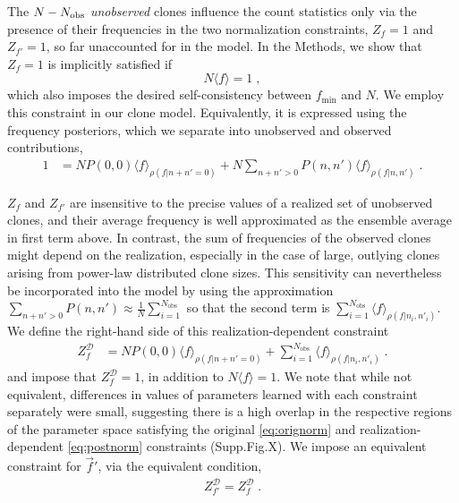\documentclass[letterpaper,english,prl,reprint,longbibliography]{revtex4-1}
\begin{document}
The $N-N_{\textrm{\textrm{obs}}}$ \emph{unobserved} clones influence the count statistics only via the presence of their frequencies in the two normalization constraints, $Z_f=1$ and $Z_{f'}=1$, so far unaccounted for in the model.
In the Methods, we show that $Z_f=1$ is implicitly satisfied if 
\begin{equation}
	N\langle f\rangle=1\;,\label{eq:orignorm}
\end{equation}
which also imposes the desired self-consistency between $f_\textrm{min}$ and $N$. We employ this constraint in our clone model. Equivalently, it is expressed using the frequency posteriors, which we separate into unobserved and observed contributions,
\begin{align*}
	1&= NP(0,0) \langle f\rangle_{\rho(f|n+n'=0)}+	N\sum_{n+n'>0}P(n,n')\langle f\rangle_{\rho(f|n,n')}\;.
\end{align*}

$Z_f$ and $Z_{f'}$ are insensitive to the precise values of a realized set of unobserved clones, and their average frequency is well approximated as the ensemble average in first term above. In contrast, the sum of frequencies of the observed clones might depend on the realization, especially in the case of large, outlying clones arising from power-law distributed clone sizes. This sensitivity can nevertheless be incorporated into the model by using the approximation $\sum_{n+n'>0}P(n,n')\approx \frac{1}{N}\sum_{i=1}^{N_\textrm{obs}}$ so that the second term is $\sum_{i=1}^{N_{\textrm{obs}}}\langle f\rangle_{\rho(f|n_i,n'_i)}$. We define the right-hand side of this realization-dependent constraint 
\begin{align}
	Z^\mathcal{D}_f&= N	P(0,0)\langle f\rangle_{\rho(f|n+n'=0)} + \sum_{i=1}^{N_{\textrm{obs}}}\langle f\rangle_{\rho(f|n_i,n'_i)}\;.\label{eq:postnorm}
\end{align}
and impose that $Z^\mathcal{D}_f=1$, in addition to $N\langle f\rangle=1$. We note that while not equivalent, differences in values of parameters learned with each constraint separately were small, suggesting there is a high overlap in the respective regions of the parameter space satisfying the original  \ref{eq:orignorm} and realization-dependent \ref{eq:postnorm} constraints (Supp.Fig.X). We impose an equivalent constraint for $\vec{f}'$, via the equivalent condition, 
\begin{align}
	Z^\mathcal{D}_{f'}=Z^\mathcal{D}_f\;.
\end{align}
\end{document}
